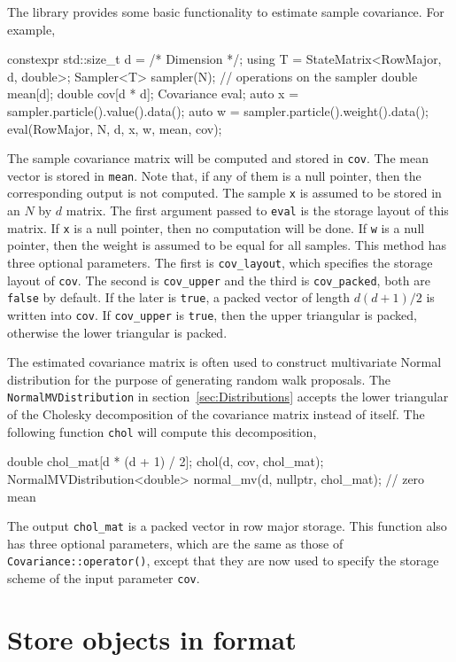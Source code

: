 The library provides some basic functionality to estimate sample covariance.
For example,
\begin{cppcode}
  constexpr std::size_t d = /* Dimension */;
  using T = StateMatrix<RowMajor, d, double>;
  Sampler<T> sampler(N);
  // operations on the sampler
  double mean[d];
  double cov[d * d];
  Covariance eval;
  auto x = sampler.particle().value().data();
  auto w = sampler.particle().weight().data();
  eval(RowMajor, N, d, x, w, mean, cov);
\end{cppcode}
The sample covariance matrix will be computed and stored in \verb|cov|. The
mean vector is stored in \verb|mean|. Note that, if any of them is a null
pointer, then the corresponding output is not computed. The sample \verb|x| is
assumed to be stored in an $N$ by $d$ matrix. The first argument passed to
\verb|eval| is the storage layout of this matrix. If \verb|x| is a null
pointer, then no computation will be done. If \verb|w| is a null pointer, then
the weight is assumed to be equal for all samples. This method has three
optional parameters. The first is \verb|cov_layout|, which specifies the
storage layout of \verb|cov|. The second is \verb|cov_upper| and the third is
\verb|cov_packed|, both are \verb|false| by default. If the later is
\verb|true|, a packed vector of length $d(d+1)/2$ is written into
\verb|cov|. If \verb|cov_upper| is \verb|true|, then the upper triangular is
packed, otherwise the lower triangular is packed.

The estimated covariance matrix is often used to construct multivariate Normal
distribution for the purpose of generating random walk proposals. The
\verb|NormalMVDistribution| in section~\ref{sec:Distributions} accepts the
lower triangular of the Cholesky decomposition of the covariance matrix instead
of itself. The following function \verb|chol| will compute this decomposition,
\begin{cppcode}
  double chol_mat[d * (d + 1) / 2];
  chol(d, cov, chol_mat);
  NormalMVDistribution<double> normal_mv(d, nullptr, chol_mat); // zero mean
\end{cppcode}
The output \verb|chol_mat| is a packed vector in row major storage. This
function also has three optional parameters, which are the same as those of
\verb|Covariance::operator()|, except that they are now used to specify the
storage scheme of the input parameter \verb|cov|.

\section{Store objects in \protect\hdf format}
\label{sec:Store objects in HDF5 format}

